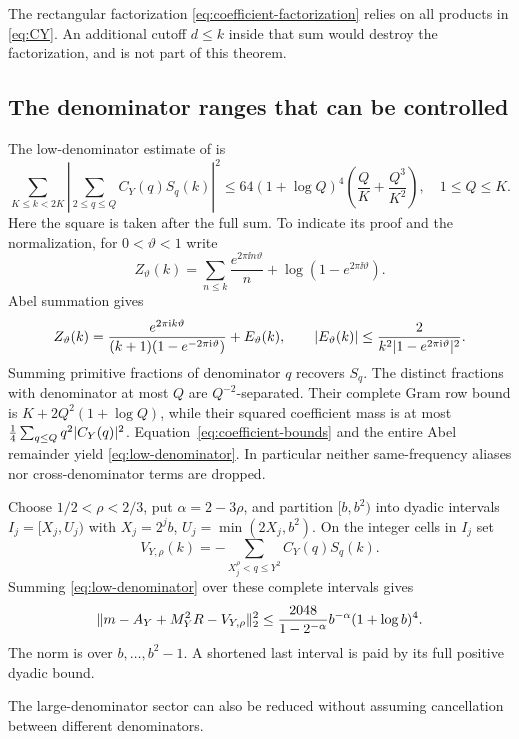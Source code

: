 The rectangular factorization \eqref{eq:coefficient-factorization} relies on all products in \eqref{eq:CY}. An additional cutoff $d\le k$ inside that sum would destroy the factorization, and is not part of this theorem.

\subsection{The denominator ranges that can be controlled}
The low-denominator estimate of \cite[native proof, Lemma 3]{R994} is
\begin{equation}\label{eq:low-denominator}
 \sum_{K\le k<2K}\left|\sum_{2\le q\le Q}C_Y(q)S_q(k)\right|^2
 \le64(1+\log Q)^4\left(\frac QK+\frac{Q^3}{K^2}\right),
 \quad 1\le Q\le K.
\end{equation}
Here the square is taken after the full sum. To indicate its proof and the normalization, for $0<\vartheta<1$ write
\[
 Z_\vartheta(k)=\sum_{n\le k}\frac{e^{2\pi\ii n\vartheta}}n
                      +\log(1-e^{2\pi\ii\vartheta}).
\]
Abel summation gives
\[
 Z_\vartheta(k)=
 \frac{e^{2\pi\mathrm i k\vartheta}}{(k+1)(1-e^{-2\pi\mathrm i\vartheta})}
 +E_\vartheta(k),\qquad
 \lvert E_\vartheta(k)\rvert\le\frac{2}{k^2\lvert1-e^{2\pi\mathrm i\vartheta}\rvert^2}.
\]
Summing primitive fractions of denominator $q$ recovers $S_q$. The distinct fractions with denominator at most $Q$ are $Q^{-2}$-separated. Their complete Gram row bound is $K+2Q^2(1+\log Q)$, while their squared coefficient mass is at most $\tfrac14\sum_{q\le Q}q^2\lvert C_Y(q)\rvert^2$. Equation~\eqref{eq:coefficient-bounds} and the entire Abel remainder yield \eqref{eq:low-denominator}. In particular neither same-frequency aliases nor cross-denominator terms are dropped.

Choose $1/2<\rho<2/3$, put $\alpha=2-3\rho$, and partition $[b,b^2)$ into dyadic intervals $I_j=[X_j,U_j)$ with $X_j=2^jb$, $U_j=\min(2X_j,b^2)$. On the integer cells in $I_j$ set
\[
 V_{Y,\rho}(k)=-\sum_{X_j^\rho<q\le Y^2}C_Y(q)S_q(k).
\]
Summing \eqref{eq:low-denominator} over these complete intervals gives
\begin{equation}\label{eq:native-error}
 \lVert m-A_Y+M_Y^2R-V_{Y,\rho}\rVert_2^2
 \le\frac{2048}{1-2^{-\alpha}}b^{-\alpha}(1+\log b)^4.
\end{equation}
The norm is over $b,\ldots,b^2-1$. A shortened last interval is paid by its full positive dyadic bound.

The large-denominator sector can also be reduced without assuming cancellation between different denominators.

